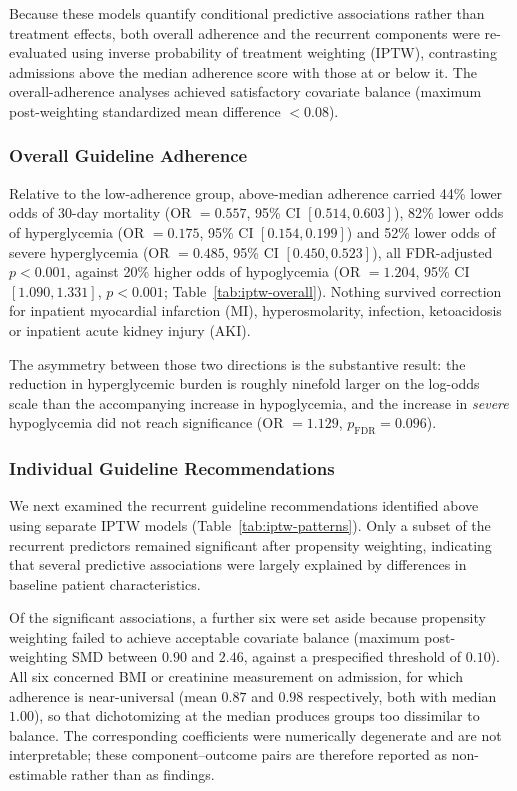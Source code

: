 Because these models quantify conditional predictive associations rather
than treatment effects, both overall adherence and the recurrent components
were re-evaluated using inverse probability of treatment weighting (IPTW),
contrasting admissions above the median adherence score with those at or
below it. The overall-adherence analyses achieved satisfactory covariate
balance (maximum post-weighting standardized mean difference $<0.08$).

\subsubsection{Overall Guideline Adherence}

Relative to the low-adherence group, above-median adherence carried 44\%
lower odds of 30-day mortality (OR $=0.557$, 95\% CI $[0.514, 0.603]$),
82\% lower odds of hyperglycemia (OR $=0.175$, 95\% CI $[0.154, 0.199]$) and
52\% lower odds of severe hyperglycemia (OR $=0.485$, 95\% CI
$[0.450, 0.523]$), all FDR-adjusted $p<0.001$, against 20\% higher odds of
hypoglycemia (OR $=1.204$, 95\% CI $[1.090, 1.331]$, $p<0.001$;
Table~\ref{tab:iptw-overall}). Nothing survived correction for inpatient
myocardial infarction (MI), hyperosmolarity, infection, ketoacidosis or
inpatient acute kidney injury (AKI).

The asymmetry between those two directions is the substantive result: the
reduction in hyperglycemic burden is roughly ninefold larger on the log-odds
scale than the accompanying increase in hypoglycemia, and the increase in
\emph{severe} hypoglycemia did not reach significance (OR $=1.129$,
$p_{\mathrm{FDR}}=0.096$).

\subsubsection{Individual Guideline Recommendations}

We next examined the recurrent guideline recommendations identified above
using separate IPTW models (Table~\ref{tab:iptw-patterns}).
Only a subset of the recurrent predictors remained significant after
propensity weighting, indicating that several predictive associations were
largely explained by differences in baseline patient characteristics.

Of the significant associations, a further six were set aside because
propensity weighting failed to achieve acceptable covariate balance
(maximum post-weighting SMD between $0.90$ and $2.46$, against a
prespecified threshold of $0.10$). All six concerned BMI or creatinine
measurement on admission, for which adherence is near-universal
(mean $0.87$ and $0.98$ respectively, both with median $1.00$), so that
dichotomizing at the median produces groups too dissimilar to balance. The
corresponding coefficients were numerically degenerate and are not
interpretable; these component--outcome pairs are therefore reported as
non-estimable rather than as findings.

